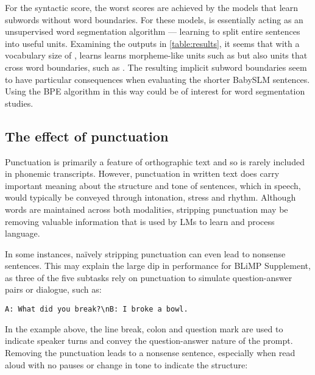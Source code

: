 

For the syntactic score, the worst scores are achieved by the models that learn subwords without word boundaries. For these models, \bpe is essentially acting as an unsupervised word segmentation algorithm --- learning to split entire sentences into useful units. Examining the outputs in \cref{table:results}, it seems that with a vocabulary size of , \bpe learns learns morpheme-like units such as  but also units that cross word boundaries, such as . The resulting implicit subword boundaries seem to have particular consequences when evaluating the shorter BabySLM sentences. Using the BPE algorithm in this way could be of interest for word segmentation studies. 

\subsection{The effect of punctuation}
\label{sec:14-punctuation}

Punctuation is primarily a feature of orthographic text and so is rarely included in phonemic transcripts. However, punctuation in written text does carry important meaning about the structure and tone of sentences, which in speech, would typically be conveyed through intonation, stress and rhythm. Although words are maintained across both modalities, stripping punctuation may be removing valuable information that is used by LMs to learn and process language. 

In some instances, na\"ively stripping punctuation can even lead to nonsense sentences. This may explain the large dip in performance for BLiMP Supplement, as three of the five subtasks rely on punctuation to simulate question-answer pairs or dialogue, such as:

\begin{center}
\texttt{A: What did you break?\textbackslash nB: I broke a bowl.}
\end{center}

In the example above, the line break, colon and question mark are used to indicate speaker turns and convey the question-answer nature of the prompt. Removing the punctuation leads to a nonsense sentence, especially when read aloud with no pauses or change in tone to indicate the structure:

